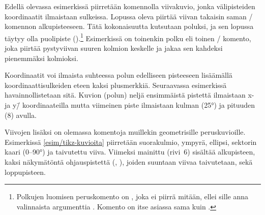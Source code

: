 Edellä olevassa esimerkissä piirretään komennolla 
viivakuvio, jonka välipisteiden koordinaatit ilmaistaan sulkeissa.
Lopussa oleva  piirtää viivan takaisin saman
\-/ komennon alkupisteeseen. Tätä kokonaisuutta kutsutaan
poluksi, ja sen lopussa täytyy olla puolipiste
(\koodi{;}).\footnote{Polkujen luomisen peruskomento on ,
  joka ei piirrä mitään, ellei sille anna valinnaista argumenttia
  . Komento  on itse asiassa sama kuin
  .} Esimerkissä on toinenkin polku eli
toinen \-/ komento, joka piirtää pystyviivan suuren
kolmion keskelle ja jakaa sen kahdeksi pienemmäksi kolmioksi.

Koordinaatit voi ilmaista suhteessa polun edelliseen pisteeseen
lisäämällä koordinaattisulkeiden eteen kaksi plusmerkkiä. Seuraavassa
esimerkissä havainnollistetaan sitä. Kuvion (polun) neljä ensimmäistä
pistettä ilmaistaan x- ja y\=/ koordinaateilla mutta viimeinen piste
ilmaistaan kulman (25°) ja pituuden (8) avulla.

\begin{koodilohkosis}
\end{koodilohkosis}

\begin{tulossis}
\end{tulossis}

\noindent
Viivojen lisäksi on olemassa komentoja muillekin geometrisille
peruskuvioille. Esimerkissä \ref{esim/tikz-kuvioita} piirretään
suorakulmio, ympyrä, ellipsi, sektorin kaari (0--90°) ja taivutettu
viiva. Viimeksi mainittu (rivi~6) sisältää alkupisteen, kaksi
näkymätöntä ohjauspistettä (, ), joiden
suuntaan viivaa taivutetaan, sekä loppupisteen.

